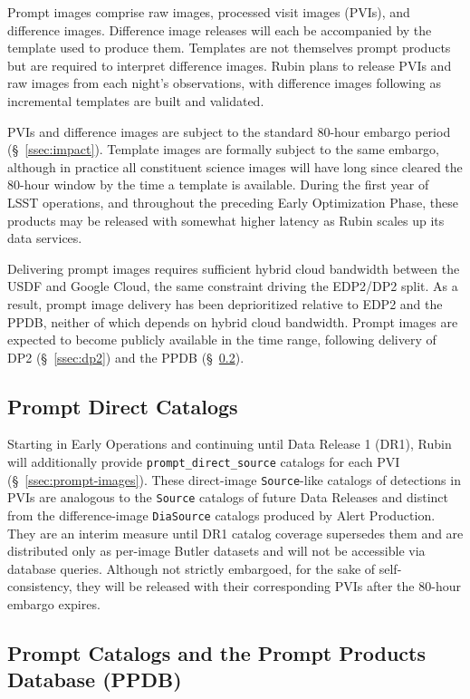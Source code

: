 Prompt images comprise raw images, processed visit images (PVIs), and difference images.
Difference image releases will each be accompanied by the template used to produce them.
Templates are not themselves prompt products but are required to interpret difference images.
Rubin plans to release PVIs and raw images from each night's observations, with difference images following as incremental templates are built and validated.

PVIs and difference images are subject to the standard 80-hour embargo period (\S~\ref{ssec:impact}).
Template images are formally subject to the same embargo, although in practice all constituent science images will have long since cleared the 80-hour window by the time a template is available.
During the first year of LSST operations, and throughout the preceding Early Optimization Phase, these products may be released with somewhat higher latency as Rubin scales up its data services.

Delivering prompt images requires sufficient hybrid cloud bandwidth between the USDF and Google Cloud, the same constraint driving the EDP2/DP2 split.
As a result, prompt image delivery has been deprioritized relative to EDP2 and the PPDB, neither of which depends on hybrid cloud bandwidth.
Prompt images are expected to become publicly available in the \npcdate time range, following delivery of DP2 (\S~\ref{ssec:dp2}) and the PPDB (\S~\ref{ssec:ppdb}).

\subsection{Prompt Direct Catalogs}
\label{ssec:prompt-direct-catalogs}

Starting in Early Operations and continuing until Data Release 1 (DR1), Rubin will additionally provide \texttt{prompt\_direct\_source} catalogs for each PVI (\S~\ref{ssec:prompt-images}).
These direct-image \texttt{Source}-like catalogs of detections in PVIs are analogous to the \texttt{Source} catalogs of future Data Releases and distinct from the difference-image \texttt{DiaSource} catalogs produced by Alert Production.
They are an interim measure until DR1 catalog coverage supersedes them and are distributed only as per-image Butler datasets and will not be accessible via database queries.
Although not strictly embargoed, for the sake of self-consistency, they will be released with their corresponding PVIs after the 80-hour embargo expires.


\subsection{Prompt Catalogs and the Prompt Products Database (PPDB)}
\label{ssec:ppdb}

